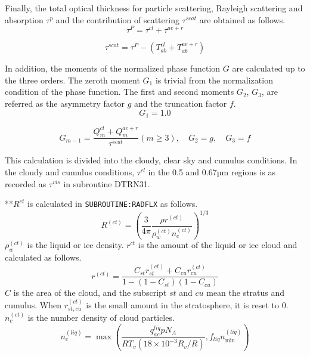 Finally, the total optical thickness for particle scattering, Rayleigh
scattering and absorption \(\tau^p\) and the contribution of scattering
\(\tau^{scat}\) are obtained as follows. \begin{equation}
\tau^{P}=\tau^{c l}+\tau^{a e+r}
\end{equation}

\begin{equation}
\tau^{s c a t}=\tau^{P}-\left(T_{ab}^{c l}+T_{ab}^{a e+r}\right)
\end{equation}

In addition, the moments of the normalized phase function \(G\) are
calculated up to the three orders. The zeroth moment \(G_1\) is trivial
from the normalization condition of the phase function. The first and
second moments \(G_2\), \(G_3\), are referred as the asymmetry factor
\(g\) and the truncation factor \(f\). \begin{equation}
G_{1}=1.0
\end{equation}

\begin{equation}
G_{m-1}=\frac{Q_{m}^{c l}+Q_{m}^{a e+r}}{\tau^{s c a t}}(m \geq 3), \quad G_{2}=g, \quad G_{3}=f
\end{equation}

This calculation is divided into the cloudy, clear sky and cumulus
conditions. In the cloudy and cumulus conditions, \(\tau^{cl}\) in the
0.5 and 0.67µm regions is as recorded as \(\tau^{vis}\) in subroutine
DTRN31.

**\(R^{ct}\) is calculated in \texttt{SUBROUTINE:RADFLX} as follows. \begin{equation}
R^{(c t)}=\left(\frac{3}{4 \pi} \frac{\rho r^{(c t)}}{\rho_{w}^{(c t)} n_{c}^{(c t)}}\right)^{1 / 3}
\end{equation} \(\rho_{w}^{(c t)}\) is the liquid or ice density. \(r^{ct}\) is the
amount of the liquid or ice cloud and calculated as follows. \begin{equation}
r^{(c t)}=\frac{C_{s t} r_{s t}^{(c t)}+C_{c u} r_{c u}^{(c t)}}{1-\left(1-C_{s t}\right)\left(1-C_{c u}\right)}
\end{equation} \(C\) is the area of the cloud, and the subscript \(st\) and \(cu\)
mean the stratus and cumulus. When \(r_{s t, c u}^{(c t)}\) is the small
amount in the stratosphere, it is reset to 0. \(n_{c}^{(c t)}\) is the
number density of cloud particles. \begin{equation}
n_{c}^{(l i q)}=\max \left(\frac{q_{a e}^{l i q} p N_{A}}{R T_{v}\left(18 \times 10^{-3} R_{v} / R\right)}, f_{l i q} n_{\min }^{(l i q)}\right)
\end{equation}

